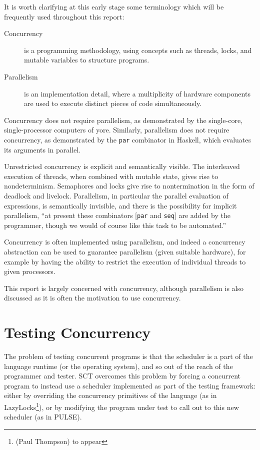 It is worth clarifying at this early stage some terminology which will
be frequently used throughout this report:

\begin{description}
  \item[Concurrency] is a programming methodology, using concepts such
    as threads, locks, and mutable variables to structure
    programs.

  \item[Parallelism] is an implementation detail, where a multiplicity
    of hardware components are used to execute distinct pieces of code
    simultaneously.
\end{description}

Concurrency does not require parallelism, as demonstrated by the
single-core, single-processor computers of yore. Similarly,
parallelism does not require concurrency, as demonstrated by the
\verb|par| combinator in Haskell, which evaluates its arguments in
parallel.

Unrestricted concurrency is explicit and semantically
visible\cite{concurrent}. The interleaved execution of threads, when
combined with mutable state, gives rise to nondeterminism. Semaphores
and locks give rise to nontermination in the form of deadlock and
livelock. Parallelism, in particular the parallel evaluation of
expressions, is semantically invisible, and there is the possibility
for implicit parallelism, ``at present these combinators [\verb|par|
and \verb|seq|] are added by the programmer, though we would of course
like this task to be automated.''\cite{gum}

Concurrency is often implemented using parallelism, and indeed a
concurrency abstraction can be used to guarantee parallelism (given
suitable hardware), for example by having the ability to restrict the
execution of individual threads to given processors.

This report is largely concerned with concurrency, although
parallelism is also discussed as it is often the motivation to use
concurrency.

\section{Testing Concurrency}
\label{sec:intro-sct}

The problem of testing concurrent programs is that the scheduler is a
part of the language runtime (or the operating system), and so out of
the reach of the programmer and tester. SCT overcomes this problem by
forcing a concurrent program to instead use a scheduler implemented as
part of the testing framework: either by overriding the concurrency
primitives of the language (as in LazyLocks\footnote{(Paul Thompson) to
  appear}), or by modifying the program under test to call out to this
new scheduler (as in PULSE\cite{pulse}).

